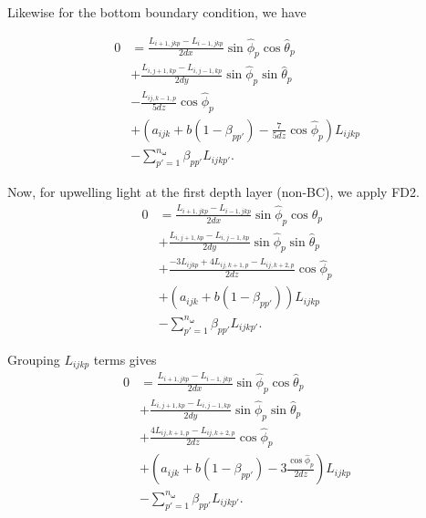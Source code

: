 \documentclass[ms,cpyr,lof,lot]{uathesis}
\renewcommand\vec\bm
\begin{document}
Likewise for the bottom boundary condition, we have

\begin{equation*}
  \begin{aligned}
    0 &= \frac{L_{i+1,jkp}-L_{i-1,jkp}}{2dx}\sin\hat{\phi}_p\cos\hat{\theta}_p \\
    &+ \frac{L_{i,j+1,kp}-L_{i,j-1,kp}}{2dy}\sin\hat{\phi}_p\sin\hat{\theta}_p \\
    &- \frac{L_{ij,k-1,p}}{5dz}\cos\hat{\phi}_p \\
    &+ (a_{ijk}+b(1-\beta_{pp'}) - \frac{7}{5dz}\cos\hat{\phi}_p)L_{ijkp} \\
    &- \sum_{p'=1}^{n_{\vec{\omega}}} \beta_{pp'} L_{ijkp'}.
  \end{aligned}
\end{equation*}

Now, for upwelling light at the first depth layer (non-BC), we apply FD2.
\begin{equation*}
  \begin{aligned}
    0 &= \frac{L_{i+1,jkp}-L_{i-1,jkp}}{2dx}\sin\hat{\phi}_p\cos\hat{\theta}_p \\
    &+ \frac{L_{i,j+1,kp}-L_{i,j-1,kp}}{2dy}\sin\hat{\phi}_p\sin\hat{\theta}_p \\
    &+ \frac{-3L_{ijkp} + 4L_{ij,k+1,p} - L_{ij,k+2,p}}{2dz}\cos\hat{\phi}_p \\
    &+ (a_{ijk}+b(1-\beta_{pp'}))L_{ijkp} \\
    &- \sum_{p'=1}^{n_{\vec{\omega}}} \beta_{pp'} L_{ijkp'}.
  \end{aligned}
\end{equation*}

Grouping $L_{ijkp}$ terms gives
\begin{equation*}
  \begin{aligned}
    0 &= \frac{L_{i+1,jkp}-L_{i-1,jkp}}{2dx}\sin\hat{\phi}_p\cos\hat{\theta}_p \\
    &+ \frac{L_{i,j+1,kp}-L_{i,j-1,kp}}{2dy}\sin\hat{\phi}_p\sin\hat{\theta}_p \\
    &+ \frac{4L_{ij,k+1,p} - L_{ij,k+2,p}}{2dz}\cos\hat{\phi}_p \\
    &+ \left(a_{ijk}+b(1-\beta_{pp'}) - 3\frac{\cos\hat\phi_p}{2dz} \right)L_{ijkp} \\
    &- \sum_{p'=1}^{n_{\vec{\omega}}} \beta_{pp'} L_{ijkp'}.
  \end{aligned}
\end{equation*}
\end{document}
